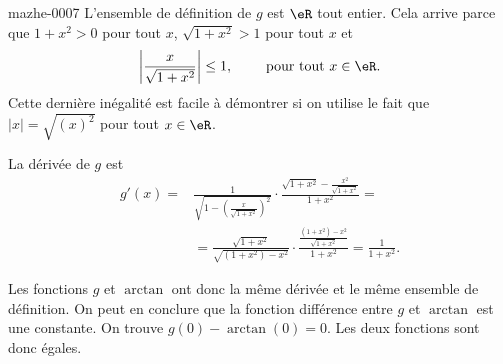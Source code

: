 

\begin{corrige}{mazhe-0007}
  L'ensemble de définition de $g$ est $\eR$ tout entier. Cela arrive parce que $1+x^2 >0$ pour tout $x$, $\sqrt{1+x^2}>1$ pour tout $x$ et 
\[
\left|\frac{x}{\sqrt{1+x^2}}\right| \leq 1, \qquad \text{ pour tout } x\in\eR . 
\]
Cette dernière inégalité est facile à démontrer si on utilise le fait que $|x| = \sqrt{(x)^2}$ pour tout $x\in\eR$.

La dérivée de $g$ est 
\begin{equation*}
  \begin{aligned}
    g' (x) = &\frac{1}{\sqrt{1-\left(\frac{x}{\sqrt{1+x^2}}\right)^2}} \cdot \frac{\sqrt{1+x^2} -\frac{x^2}{\sqrt{1+x^2}}}{1+x^2} = \\
    &= \frac{\sqrt{1+x^2}}{\sqrt{(1+x^2)-x^2}}\cdot\frac{\frac{(1+x^2) -x^2}{\sqrt{1+x^2}}}{1+x^2} =\frac{1}{1+x^2}.
  \end{aligned}
\end{equation*}

Les fonctions $g$  et $\arctan$ ont donc la m\^eme dérivée et le m\^eme ensemble de définition. On peut en conclure que la fonction différence entre $g$ et $\arctan$  est une constante.  On trouve $g(0)-\arctan(0) = 0$. Les deux fonctions sont donc égales. 
 
\end{corrige}
